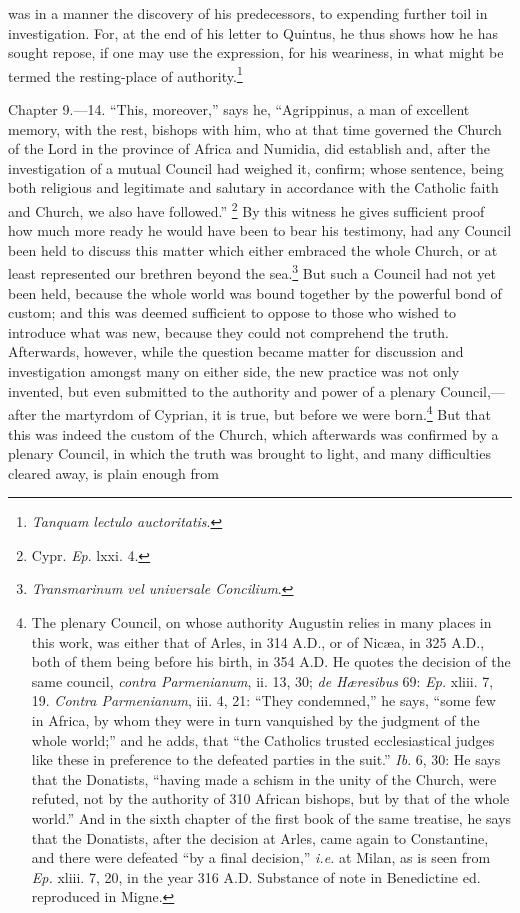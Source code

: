 was in a manner the discovery of his predecessors, to expending further toil in investigation. For, at the end of his letter to Quintus, he thus shows how he has sought repose, if one may use the expression, for his weariness, in what might be termed the resting-place of authority.\footnote{\par  \emph{Tanquam lectulo auctoritatis}.}


Chapter 9.—14. ``This, moreover,'' says he, ``Agrippinus, a man of excellent memory, with the rest, bishops with him, who at that time governed the Church of the Lord in the province of Africa and Numidia, did establish and, after the investigation of a mutual Council had weighed it, confirm; whose sentence, being both religious and legitimate and salutary in accordance with the Catholic faith and Church, we also have followed.'' \footnote{\par  Cypr. \emph{Ep}. lxxi. 4.} By this witness he gives sufficient proof how much more ready he would have been to bear his testimony, had any Council been held to discuss this matter which either embraced the whole Church, or at least represented our brethren beyond the sea.\footnote{\par  \emph{Transmarinum vel universale Concilium}.} But such a Council had not yet been held, because the whole world was bound together by the powerful bond of custom; and this was deemed sufficient to oppose to those who wished to introduce what was new, because they could not comprehend the truth. Afterwards, however, while the question became matter for discussion and investigation amongst many on either side, the new practice was not only invented, but even submitted to the authority and power of a plenary Council,—after the martyrdom of Cyprian, it is true, but before we were born.\footnote{\par  The plenary Council, on whose authority Augustin relies in many places in this work, was either that of Arles, in 314 A.D., or of Nicæa, in 325 A.D., both of them being before his birth, in 354 A.D. He quotes the decision of the same council, \emph{contra Parmenianum}, ii. 13, 30; \emph{de Hæresibus} 69: \emph{Ep.} xliii. 7, 19. \emph{Contra Parmenianum}, iii. 4, 21: ``They condemned,'' he says, ``some few in Africa, by whom they were in turn vanquished by the judgment of the whole world;'' and he adds, that ``the Catholics trusted ecclesiastical judges like these in preference to the defeated parties in the suit.'' \emph{Ib}. 6, 30: He says that the Donatists, ``having made a schism in the unity of the Church, were refuted, not by the authority of 310 African bishops, but by that of the whole world.'' And in the sixth chapter of the first book of the same treatise, he says that the Donatists, after the decision at Arles, came again to Constantine, and there were defeated ``by a final decision,'' \emph{i.e.} at Milan, as is seen from \emph{Ep.} xliii. 7, 20, in the year 316  A.D. Substance of note in Benedictine ed. reproduced in Migne.} But that this was indeed the custom of the Church, which afterwards was confirmed by a plenary Council, in which the truth was brought to light, and many difficulties cleared away, is plain enough from 